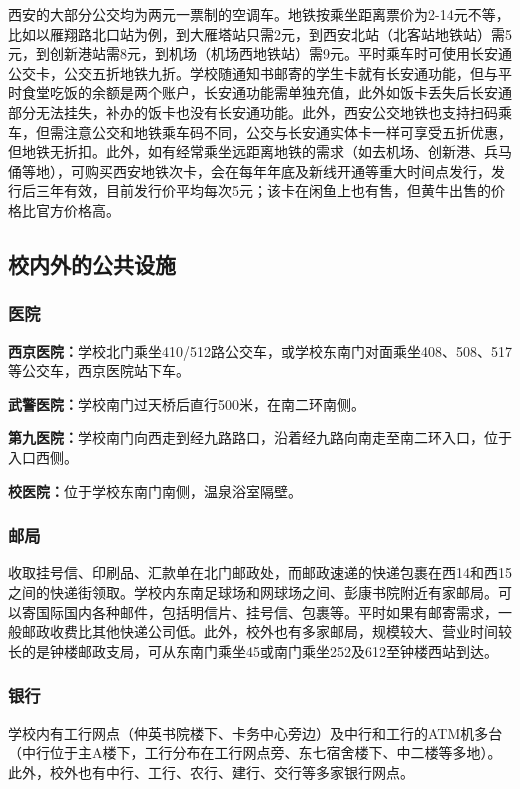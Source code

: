 \documentclass[
decoration,  %
]{qyxf-book}
\begin{document}
西安的大部分公交均为两元一票制的空调车。地铁按乘坐距离票价为2-14元不等，比如以雁翔路北口站为例，到大雁塔站只需2元，到西安北站（北客站地铁站）需5元，到创新港站需8元，到机场（机场西地铁站）需9元。平时乘车时可使用长安通公交卡，公交五折地铁九折。学校随通知书邮寄的学生卡就有长安通功能，但与平时食堂吃饭的余额是两个账户，长安通功能需单独充值，此外如饭卡丢失后长安通部分无法挂失，补办的饭卡也没有长安通功能。此外，西安公交地铁也支持扫码乘车，但需注意公交和地铁乘车码不同，公交与长安通实体卡一样可享受五折优惠，但地铁无折扣。此外，如有经常乘坐远距离地铁的需求（如去机场、创新港、兵马俑等地），可购买西安地铁次卡，会在每年年底及新线开通等重大时间点发行，发行后三年有效，目前发行价平均每次5元；该卡在闲鱼上也有售，但黄牛出售的价格比官方价格高。






\subsection{校内外的公共设施}


\subsubsection{医院}

\textbf{西京医院：}学校北门乘坐410/512路公交车，或学校东南门对面乘坐408、508、517等公交车，西京医院站下车。

\textbf{武警医院：}学校南门过天桥后直行500米，在南二环南侧。

\textbf{第九医院：}学校南门向西走到经九路路口，沿着经九路向南走至南二环入口，位于入口西侧。

\textbf{校医院：}位于学校东南门南侧，温泉浴室隔壁。

\subsubsection{邮局}

收取挂号信、印刷品、汇款单在北门邮政处，而邮政速递的快递包裹在西14和西15之间的快递街领取。学校内东南足球场和网球场之间、彭康书院附近有家邮局。可以寄国际国内各种邮件，包括明信片、挂号信、包裹等。平时如果有邮寄需求，一般邮政收费比其他快递公司低。此外，校外也有多家邮局，规模较大、营业时间较长的是钟楼邮政支局，可从东南门乘坐45或南门乘坐252及612至钟楼西站到达。

\subsubsection{银行}
学校内有工行网点（仲英书院楼下、卡务中心旁边）及中行和工行的ATM机多台（中行位于主A楼下，工行分布在工行网点旁、东七宿舍楼下、中二楼等多地）。此外，校外也有中行、工行、农行、建行、交行等多家银行网点。
\end{document}
